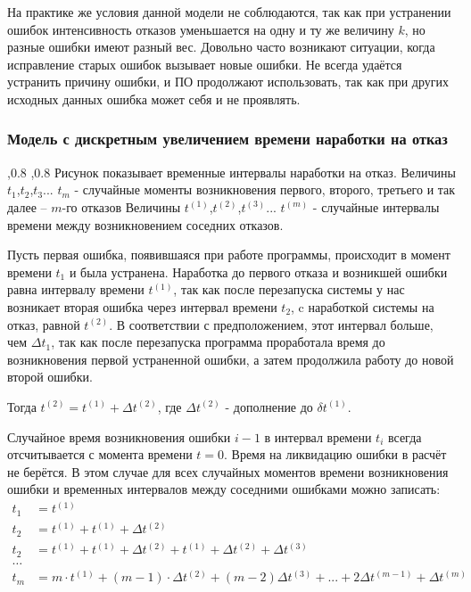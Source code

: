 \documentclass[a4paper, 12pt]{extarticle}
\begin{document}
 		На практике же условия данной модели не соблюдаются, так как при устранении ошибок интенсивность отказов уменьшается на одну и ту же величину $k$, но разные ошибки имеют разный вес. Довольно часто возникают ситуации, когда исправление старых ошибок вызывает новые ошибки. Не всегда удаётся устранить причину ошибки, и ПО продолжают использовать, так как при других исходных данных ошибка может себя и не проявлять.
		
	\subsubsection{	Модель с дискретным увеличением времени наработки на отказ}
	,0.8
	,0.8
	Рисунок показывает временные интервалы наработки на отказ. 
	Величины $t_1$,$t_2$,$t_3$... $t_m$ - случайные моменты возникновения  первого, второго, третьего и так далее – $m$-го отказов
	Величины $t^{(1)}$,$t^{(2)}$,$t^{(3)}$... $t^{(m)}$ - случайные интервалы времени между возникновением соседних отказов.
	
	Пусть первая ошибка, появившаяся при работе программы, происходит в момент времени $t_1$ и была устранена. Наработка до первого отказа и возникшей ошибки равна интервалу времени $t^{(1)}$, так как после перезапуска системы у нас возникает вторая ошибка через интервал времени $t_2$, c наработкой системы на отказ, равной $t^{(2)}$. В соответствии с предположением, этот интервал больше, чем $\Delta t_1$, так как после перезапуска программа проработала время до возникновения первой устраненной ошибки, а затем продолжила работу до
новой второй ошибки. 

	Тогда $t^{(2)}=t^{(1)}+\Delta t^{(2)}$, где $\Delta t^{(2)}$ - дополнение до $\delta t^{(1)}$.
	
	Случайное время возникновения ошибки $i-1$ в интервал времени $t_i$ всегда отсчитывается с момента времени $t=0$. Время на ликвидацию ошибки в расчёт не берётся. В этом случае для всех случайных моментов времени возникновения ошибки и временных интервалов между соседними ошибками можно записать:
\begin{align*}
	t_1 &= t^{(1)}\\
	t_2 &= t^{(1)} + t^{(1)} + \Delta t^{(2)}\\
	t_2 &= t^{(1)} + t^{(1)} + \Delta t^{(2)} + t^{(1)} + \Delta t^{(2)} +\Delta t^{(3)}\\
	\ldots &	\\
	t_m &= m \cdot t^{(1)} + (m-1)\cdot\Delta t^{(2)} + (m-2)\Delta t^{(3)} +... +2\Delta t^{(m-1)} +\Delta t^{(m)}
\end{align*}	
	
\end{document}
